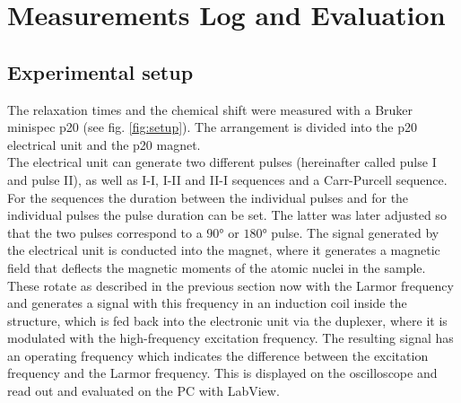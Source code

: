 \section{Measurements Log and Evaluation}



\subsection{Experimental setup}
The relaxation times and the chemical shift were measured with a Bruker minispec p20 (see fig. \ref{fig:setup}).
The arrangement is divided into the p20 electrical unit and the p20 magnet.\\
The electrical unit can generate two different pulses (hereinafter called pulse I and pulse II), as well as I-I, I-II and II-I sequences and a Carr-Purcell sequence.
For the sequences the duration between the individual pulses and for the individual pulses the pulse duration can be set.
The latter was later adjusted so that the two pulses correspond to a $\ang{90}$ or $\ang{180}$ pulse.
The signal generated by the electrical unit is conducted into the magnet, where it generates a magnetic field that deflects the magnetic moments of the atomic nuclei in the sample.
These rotate as described in the previous section now with the Larmor frequency and generates a signal with this frequency in an induction coil inside the structure, which is fed back into the electronic unit via the duplexer, where it is modulated with the high-frequency excitation frequency.
The resulting signal has an operating frequency which indicates the difference between the excitation frequency and the Larmor frequency.
This is displayed on the oscilloscope and read out and evaluated on the PC with LabView.



